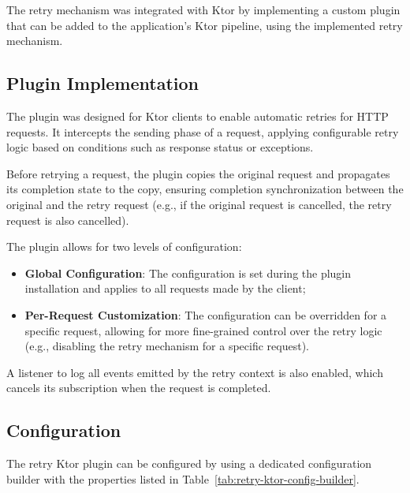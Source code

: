 The retry mechanism was integrated with Ktor
by implementing a custom plugin that can be added to the application's Ktor pipeline,
using the implemented retry mechanism.

\subsection{Plugin Implementation}\label{subsec:request-retry-plugin}

The plugin was designed for Ktor clients to enable automatic retries for HTTP requests.
It intercepts the sending phase of a request,
applying configurable retry logic based on conditions such as response status or exceptions.

Before retrying a request,
the plugin copies the original request and propagates its completion state to the copy,
ensuring completion synchronization between the original and the retry request
(e.g., if the original request is cancelled, the retry request is also cancelled).

The plugin allows for two levels of configuration:

\begin{itemize}
    \item \textbf{Global Configuration}: The configuration is set during the plugin installation and applies to all requests made by the client;
    \item \textbf{Per-Request Customization}: The configuration can be overridden for a specific request, allowing for more fine-grained control over the retry logic (e.g., disabling the retry mechanism for a specific request).
\end{itemize}

A listener to log all events emitted by the retry context is also enabled,
which cancels its subscription when the request is completed.

\subsection{Configuration}\label{subsec:retry-ktor-configuration}

The retry Ktor plugin can be configured by using a dedicated configuration builder with the properties listed in
Table~\ref{tab:retry-ktor-config-builder}.

